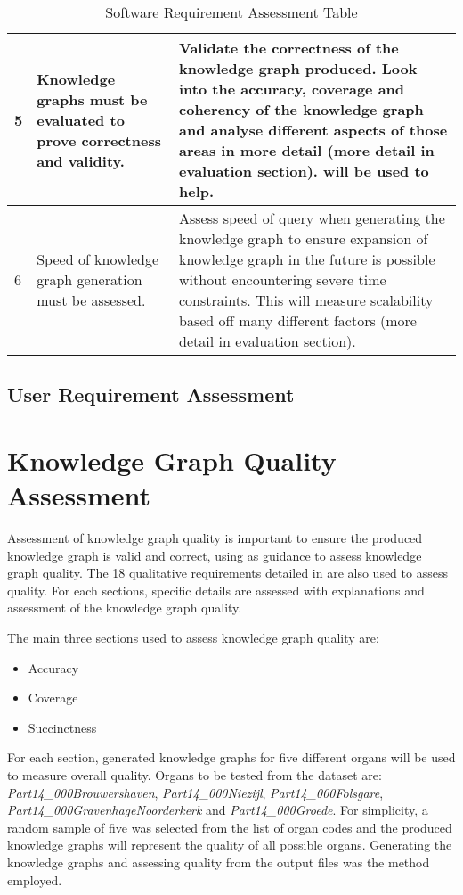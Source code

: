 \begin{longtable}{|p{2.25cm}|p{5.5cm}|p{5.5cm}|}
5&
Knowledge graphs must be evaluated to prove correctness and validity. &
Validate the correctness of the knowledge graph produced. Look into the accuracy, coverage and coherency of the knowledge graph and analyse different aspects of those areas in more detail (more detail in evaluation section). \cite{knowledgegraphevaulationbook} will be used to help. \\ 
\hline

6&
Speed of knowledge graph generation must be assessed. &
Assess speed of query when generating the knowledge graph to ensure expansion of knowledge graph in the future is possible without encountering severe time constraints. This will measure scalability based off many different factors (more detail in evaluation section). 
\hline
\caption{Software Requirement Assessment Table}
\end{longtable}

\subsection{User Requirement Assessment}


\section{Knowledge Graph Quality Assessment}
\hspace{0.5cm} Assessment of knowledge graph quality is important to ensure the produced knowledge graph is valid and correct, using \cite{knowledgegraphevaulationbook} as guidance to assess knowledge graph quality. The 18 qualitative requirements detailed in \cite{evaluationpaper} are also used to assess quality. For each sections, specific details are assessed with explanations and assessment of the knowledge graph quality. 

The main three sections used to assess knowledge graph quality are: 

\vspace{-0.2cm}
\begin{itemize}
    \itemsep0em 
    \item Accuracy
    \vspace{-0.15cm}
    \item Coverage
    \vspace{-0.15cm}
    \item Succinctness
\end{itemize}
\vspace{-0.1cm}

For each section, generated knowledge graphs for five different organs will be used to measure overall quality. Organs to be tested from the dataset are: \textit{Part14\_000Brouwershaven}, \textit{Part14\_000Niezijl}, \textit{Part14\_000Folsgare}, \textit{Part14\_000GravenhageNoorderkerk} and \textit{Part14\_000Groede}. For simplicity, a random sample of five was selected from the list of organ codes and the produced knowledge graphs will represent the quality of all possible organs. Generating the knowledge graphs and assessing quality from the output files was the method employed. 

